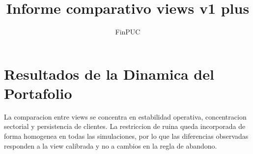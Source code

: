 \documentclass[11pt]{article}
\title{Informe comparativo views v1 plus}
\author{FinPUC}
\date{}
\begin{document}
\maketitle

\tableofcontents

\newpage

\section{Resultados de la Dinamica del Portafolio}

La comparacion entre views se concentra en estabilidad operativa, concentracion sectorial y persistencia de clientes. La restriccion de ruina queda incorporada de forma homogenea en todas las simulaciones, por lo que las diferencias observadas responden a la view calibrada y no a cambios en la regla de abandono.
\end{document}
